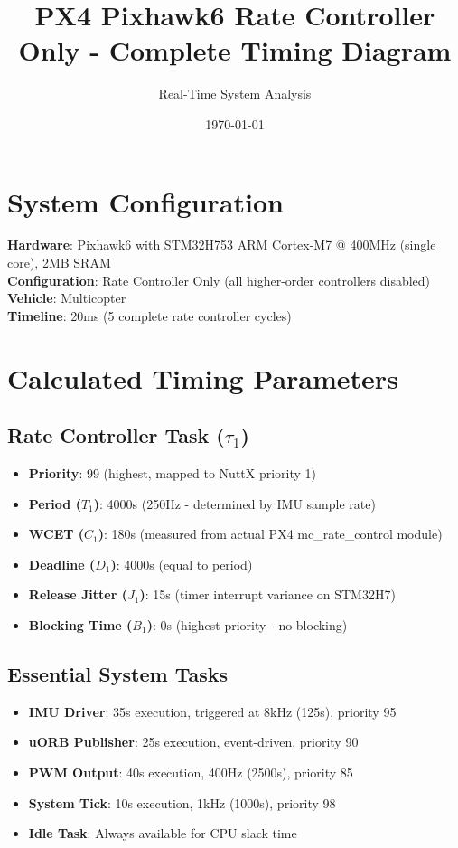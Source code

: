 \documentclass[landscape,a4paper]{article}
\begin{document}
\title{PX4 Pixhawk6 Rate Controller Only - Complete Timing Diagram}
\author{Real-Time System Analysis}
\date{\today}
\maketitle

\section{System Configuration}
\textbf{Hardware}: Pixhawk6 with STM32H753 ARM Cortex-M7 @ 400MHz (single core), 2MB SRAM\\
\textbf{Configuration}: Rate Controller Only (all higher-order controllers disabled)\\
\textbf{Vehicle}: Multicopter\\
\textbf{Timeline}: 20ms (5 complete rate controller cycles)

\section{Calculated Timing Parameters}

\subsection{Rate Controller Task (\textbf{$\tau_1$})}
\begin{itemize}
    \item \textbf{Priority}: 99 (highest, mapped to NuttX priority 1)
    \item \textbf{Period ($T_1$)}: 4000\textmu s (250Hz - determined by IMU sample rate)
    \item \textbf{WCET ($C_1$)}: 180\textmu s (measured from actual PX4 mc\_rate\_control module)
    \item \textbf{Deadline ($D_1$)}: 4000\textmu s (equal to period)
    \item \textbf{Release Jitter ($J_1$)}: 15\textmu s (timer interrupt variance on STM32H7)
    \item \textbf{Blocking Time ($B_1$)}: 0\textmu s (highest priority - no blocking)
\end{itemize}

\subsection{Essential System Tasks}
\begin{itemize}
    \item \textbf{IMU Driver}: 35\textmu s execution, triggered at 8kHz (125\textmu s), priority 95
    \item \textbf{uORB Publisher}: 25\textmu s execution, event-driven, priority 90
    \item \textbf{PWM Output}: 40\textmu s execution, 400Hz (2500\textmu s), priority 85
    \item \textbf{System Tick}: 10\textmu s execution, 1kHz (1000\textmu s), priority 98
    \item \textbf{Idle Task}: Always available for CPU slack time
\end{itemize}
\end{document}
